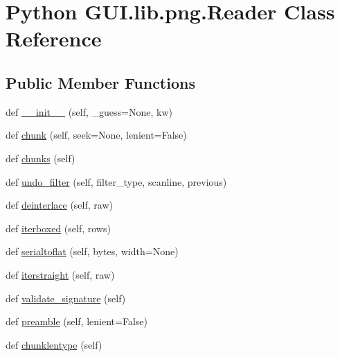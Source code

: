 \hypertarget{class_python_01_g_u_i_1_1lib_1_1png_1_1_reader}{}\section{Python G\+U\+I.\+lib.\+png.\+Reader Class Reference}
\label{class_python_01_g_u_i_1_1lib_1_1png_1_1_reader}
\subsection*{Public Member Functions}
\begin{DoxyCompactItemize}
\item 
def \hyperlink{class_python_01_g_u_i_1_1lib_1_1png_1_1_reader_a1b418d2d6104b7dd95cc8703051d8a1f}{\+\_\+\+\_\+init\+\_\+\+\_\+} (self, \+\_\+guess=None, kw)
\item 
def \hyperlink{class_python_01_g_u_i_1_1lib_1_1png_1_1_reader_afdde66c74c4a588f77ce5a5a51e19d20}{chunk} (self, seek=None, lenient=False)
\item 
def \hyperlink{class_python_01_g_u_i_1_1lib_1_1png_1_1_reader_a5543f80c2ea7a9800e97bebc5a1669b3}{chunks} (self)
\item 
def \hyperlink{class_python_01_g_u_i_1_1lib_1_1png_1_1_reader_a36ed43d219060dff3d3090e6b44dcec9}{undo\+\_\+filter} (self, filter\+\_\+type, scanline, previous)
\item 
def \hyperlink{class_python_01_g_u_i_1_1lib_1_1png_1_1_reader_a6a088c059d68156e7e660c4d30e09d75}{deinterlace} (self, raw)
\item 
def \hyperlink{class_python_01_g_u_i_1_1lib_1_1png_1_1_reader_aa96e3e861ca9e3dcd042266478f8197d}{iterboxed} (self, rows)
\item 
def \hyperlink{class_python_01_g_u_i_1_1lib_1_1png_1_1_reader_ac0c234ad7bec1ecc87733167e8aa4fbc}{serialtoflat} (self, bytes, width=None)
\item 
def \hyperlink{class_python_01_g_u_i_1_1lib_1_1png_1_1_reader_a2a7a99295f841ace43bdc50855c35e36}{iterstraight} (self, raw)
\item 
def \hyperlink{class_python_01_g_u_i_1_1lib_1_1png_1_1_reader_a517babe81ebf2d6f14346c82a2f6625a}{validate\+\_\+signature} (self)
\item 
def \hyperlink{class_python_01_g_u_i_1_1lib_1_1png_1_1_reader_a2112fb66cd97c180f2fc274b25695fa9}{preamble} (self, lenient=False)
\item 
def \hyperlink{class_python_01_g_u_i_1_1lib_1_1png_1_1_reader_af64dd7c0a755095c8cc34cdb175b0737}{chunklentype} (self)

\end{DoxyCompactItemize}
